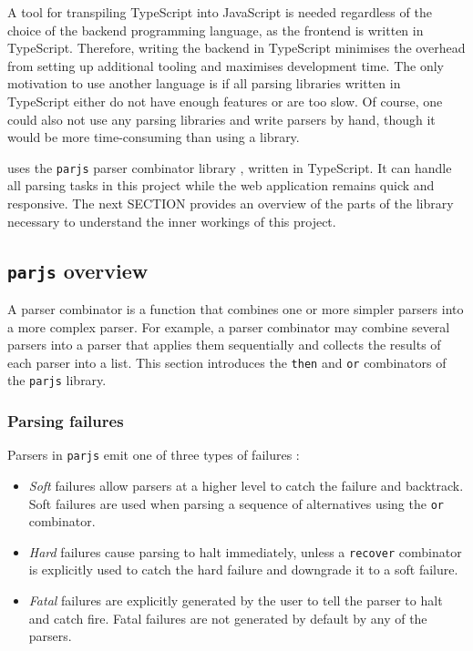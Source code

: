 A tool for transpiling TypeScript into JavaScript is needed regardless of the choice of the backend programming language, as the frontend is written in TypeScript. Therefore, writing the backend in TypeScript minimises the overhead from setting up additional tooling and maximises development time. The only motivation to use another language is if all parsing libraries written in TypeScript either do not have enough features or are too slow. Of course, one could also not use any parsing libraries and write parsers by hand, though it would be more time-consuming than using a library.

\projectname{} uses the \lstinline{parjs} parser combinator library \cite{parjs}, written in TypeScript. It can handle all parsing tasks in this project while the web application remains quick and responsive. The next SECTION provides an overview of the parts of the library necessary to understand the inner workings of this project.

\subsection{\texorpdfstring{\lstinline{parjs}}{parjs} overview}
A parser combinator is a function that combines one or more simpler parsers into a more complex parser. For example, a parser combinator may combine several parsers into a parser that applies them sequentially and collects the results of each parser into a list. This section introduces the \lstinline{then} and \lstinline{or} combinators of the \lstinline{parjs} library.

\subsubsection{Parsing failures}
Parsers in \lstinline{parjs} emit one of three types of failures \cite{parjs}:
\begin{itemize}
    \item \textit{Soft} failures allow parsers at a higher level to catch the failure and backtrack. Soft failures are used when parsing a sequence of alternatives using the \lstinline{or} combinator.
    \item \textit{Hard} failures cause parsing to halt immediately, unless a \lstinline{recover} combinator is explicitly used to catch the hard failure and downgrade it to a soft failure.
    \item \textit{Fatal} failures are explicitly generated by the user to tell the parser to halt and catch fire. Fatal failures are not generated by default by any of the parsers.
\end{itemize}

